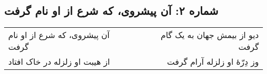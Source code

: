 \begin{center}
\section*{شماره ۲: آن پیشروی، که شرع از او نام گرفت}
\label{sec:002}
\begin{longtable}{l p{0.5cm} r}
آن پیشروی، که شرع از او نام گرفت
&&
دیو از بیمش جهان به یک گام گرفت
\\
از هیبت او زلزله در خاک افتاد
&&
وز دِرّهٔ او زلزله آرام گرفت
\\
\end{longtable}
\end{center}
